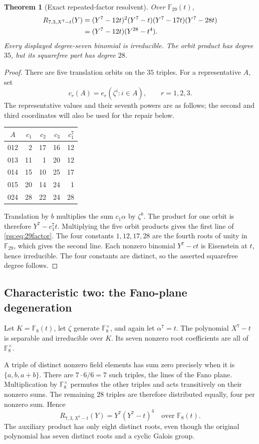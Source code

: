 \documentclass[11pt,a4paper]{article}
\newtheorem{theorem}{Theorem}[section]
\theoremstyle{definition}
\theoremstyle{remark}
\newcommand{\F}{\mathbb F}
\begin{document}
\begin{theorem}[Exact repeated-factor resolvent]\label{rss:thm:29}
Over $\F_{29}(t)$,
\begin{align}
 R_{7,3,X^7-t}(Y)
 &= (Y^7-12t)^2(Y^7-t)(Y^7-17t)(Y^7-28t)\notag\\
 &= (Y^7-12t)(Y^{28}-t^4).
 \label{rss:eq:29factor}
\end{align}
Every displayed degree-seven binomial is irreducible. The orbit product
has degree $35$, but its squarefree part has degree $28$.
\end{theorem}
\begin{proof}
There are five translation orbits on the $35$ triples. For a representative
$A$, set
\[
 c_r(A)=e_r(\zeta^i:i\in A),\qquad r=1,2,3.
\]
The representative values and their seventh powers are as follows; the
second and third coordinates will also be used for the repair below.
\begin{center}
\begin{tabular}{@{}crrrr@{}}
\toprule
$A$&$c_1$&$c_2$&$c_3$&$c_1^7$\\
\midrule
012&2&17&16&12\\
013&11&1&20&12\\
014&15&10&25&17\\
015&20&14&24&1\\
024&28&22&24&28\\
\bottomrule
\end{tabular}
\end{center}
Translation by $b$ multiplies the sum $c_1\alpha$ by $\zeta^b$.
The product for one orbit is therefore $Y^7-c_1^7t$. Multiplying the five
orbit products gives the first line of \eqref{rss:eq:29factor}. The four
constants $1,12,17,28$ are the fourth roots of unity in $\F_{29}$, which
gives the second line. Each nonzero binomial $Y^7-ct$ is Eisenstein at $t$,
hence irreducible. The four constants are distinct, so the asserted
squarefree degree follows.
\end{proof}

\subsection{Characteristic two: the Fano-plane degeneration}

Let $K=\F_8(t)$, let $\zeta$ generate $\F_8^\times$, and again let
$\alpha^7=t$. The polynomial $X^7-t$ is separable and irreducible over $K$.
Its seven nonzero root coefficients are all of $\F_8^\times$.

A triple of distinct nonzero field elements has sum zero precisely when it
is $\{a,b,a+b\}$. There are $7\cdot6/6=7$ such triples, the lines of the
Fano plane. Multiplication by $\F_8^\times$ permutes the other triples and
acts transitively on their nonzero sums. The remaining $28$ triples are
therefore distributed equally, four per nonzero sum. Hence
\begin{equation}
 R_{7,3,X^7-t}(Y)=Y^7(Y^7-t)^4\quad\text{over }\F_8(t).
 \label{rss:eq:char2}
\end{equation}
The auxiliary product has only eight distinct roots, even though the
original polynomial has seven distinct roots and a cyclic Galois group.
\end{document}
